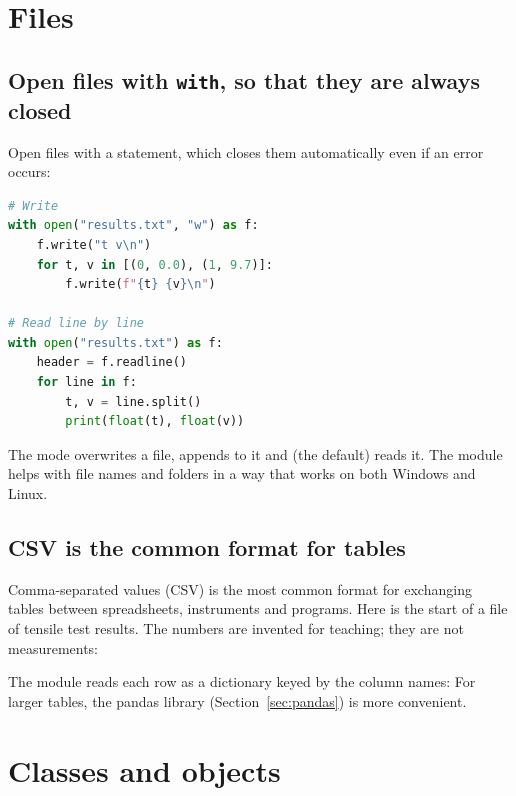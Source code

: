 \section{Files}

\subsection*{Open files with \texttt{with}, so that they are always closed}

Open files with a  statement, which closes them automatically even if an error
occurs:
\begin{lstlisting}[language=Python]
# Write
with open("results.txt", "w") as f:
    f.write("t v\n")
    for t, v in [(0, 0.0), (1, 9.7)]:
        f.write(f"{t} {v}\n")

# Read line by line
with open("results.txt") as f:
    header = f.readline()
    for line in f:
        t, v = line.split()
        print(float(t), float(v))
\end{lstlisting}
The mode  overwrites a file,  appends to it and  (the
default) reads it. The  module helps with file names and folders in a way
that works on both Windows and Linux.

\subsection*{CSV is the common format for tables}

Comma-separated values (CSV) is the most common format for exchanging tables between
spreadsheets, instruments and programs. Here is the start of a file of tensile test
results. The numbers are invented for teaching; they are not measurements:

The  module reads each row as a dictionary keyed by the column names:
For larger tables, the pandas library (Section~\ref{sec:pandas}) is more convenient.

\section{Classes and objects}

